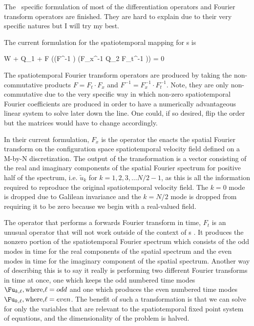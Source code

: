 The \ppo\ specific formulation of most of the differentiation operators
and Fourier transform operators are finished. They are hard to explain
due to their very specific natures but I will try my best.

The current formulation for the spatiotemporal mapping for {\ppo}s
is

\beq \label{e-spatiotempPPO}
W \cdot \Fu + Q_1 \cdot \Fu + F \cdot ((F^{-1} \cdot \Fu) \ast (F_x^{-1} \cdot Q_2 \cdot F_t^{-1} \cdot \Fu)) = 0
\eeq

The spatiotemporal Fourier transform operators are produced by taking the non-commutative products
$F = F_t \cdot F_x$ and $F^{-1} = F_x^{-1} \cdot F_t^{-1}$. Note, they are only non-commutative due
to the very specific way in which non-zero spatiotemporal Fourier coefficients are produced in order
to have a numerically advantageous linear system to solve later down the line. One could, if so desired,
flip the order but the matrices would have to change accordingly.

In their current formulation, $F_x$ is the operator the enacts the spatial Fourier transform on the
configuration space spatiotemporal velocity field defined on a M-by-N discretization. The output
of the transformation is a vector consisting of the real and imaginary components of the spatial
Fourier spectrum for positive half of the spectrum, i.e. $\tilde{u}_k$ for $k = 1,2,3, \ldots N/2-1$,
as this is all the information required to reproduce the original spatiotemporal velocity field. The
$k=0$ mode is dropped due to Galilean invariance and the $k = N/2$ mode is dropped from requiring it
to be zero because we begin with a real-valued field.

The operator that performs a forwards Fourier transform in time, $F_t$ is an unusual operator that
will not work outside of the context of {\ppo}s . It produces the nonzero portion of the spatiotemporal
Fourier spectrum which consists of the odd modes in time for the real components of the spatial spectrum
and the even modes in time for the imaginary component of the spatial spectrum. Another way of describing
this is to say it really is performing two different Fourier transforms in time at once, one which keeps the odd
numbered time modes $\Fu_{k,\ell}, \mbox{where,} \ell = odd$ and one which produces the even numbered time
modes $\Fu_{k,\ell}, \mbox{where,} \ell = even$. The benefit of such a transformation is that we can solve
for only the variables that are relevant to the spatiotemporal fixed point system of equations, and the
dimensionality of the problem is halved.

